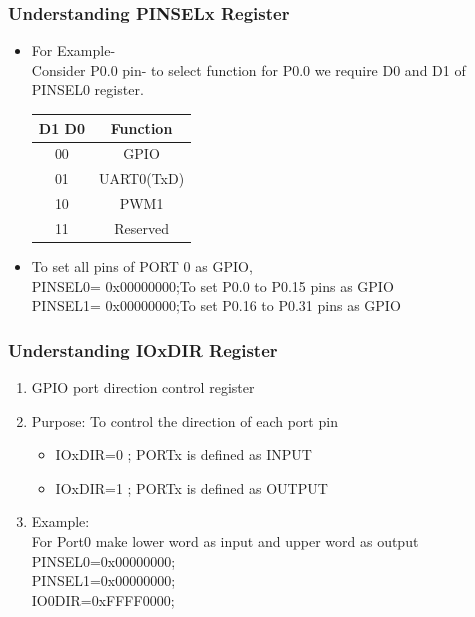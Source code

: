 \documentclass[10pt,red]{beamer}
\begin{document}
\begin{frame}
	\frametitle{Understanding PINSELx Register} \pause
	\begin{itemize}
		\item<+-|alert@+> For Example-    \\[10pt]
		Consider P0.0 pin- to select function for P0.0 we require D0 and D1 of PINSEL0 register.
	\pause
	\begin{center}
	\begin{tabular}{|c|c|}
		\hline \textbf{D1 D0} & \textbf{Function} \\ 
		\hline 00 & GPIO \\ 
		\hline 01 & UART0(TxD) \\ 
		\hline 10 & PWM1 \\ 
		\hline 11 & Reserved \\ 
		\hline 
	\end{tabular} \pause
	\end{center}
		\item<+-|alert@+> To set all pins of PORT 0 as GPIO, \\
			PINSEL0= 0x00000000;\hspace{0.8cm}\color{red}To set P0.0 to P0.15 pins as GPIO\color{black} \\
			PINSEL1= 0x00000000;\hspace{0.8cm}\color{red}To set P0.16 to P0.31 pins as GPIO\color{black} \\
	\end{itemize} 			
\end{frame}

\begin{frame}
	\frametitle{Understanding IOxDIR Register} \pause
		\begin{enumerate}
			\item<+-|alert@+> GPIO port direction control register   \\[10pt]
			\item<+-|alert@+> Purpose: To control the direction of each port pin    \\[10pt]
			\begin{itemize}
				\item<+-|alert@+> IOxDIR=0 ; PORTx is defined as INPUT  \\[10pt]	
				\item<+-|alert@+> IOxDIR=1 ; PORTx is defined as OUTPUT  \\[10pt]
			\end{itemize}			
			\item<+-|alert@+> \color{red}Example: \\[10pt]
		\color{black}For Port0 make lower word as input and upper word as
			output  \\[10pt]
			\pause	
			PINSEL0=0x00000000; \\
			PINSEL1=0x00000000;\\
			IO0DIR=0xFFFF0000;
		\end{enumerate}
\end{frame}
\end{document}
